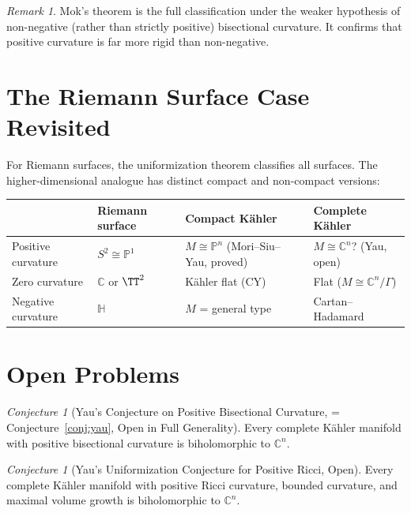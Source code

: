 \documentclass[12pt,a4paper]{amsart}
\theoremstyle{definition}
\theoremstyle{remark}
\newtheorem{remark}[theorem]{Remark}
\newtheorem{conjecture}[theorem]{Conjecture}
\newcommand{\CC}{\mathbb{C}}
\newcommand{\PP}{\mathbb{P}}
\begin{document}
\begin{remark}
Mok's theorem is the full classification under the weaker hypothesis of
non-negative (rather than strictly positive) bisectional curvature.
It confirms that positive curvature is far more rigid than non-negative.
\end{remark}

\section{The Riemann Surface Case Revisited}

For Riemann surfaces, the uniformization theorem classifies all surfaces.
The higher-dimensional analogue has distinct compact and non-compact versions:

\begin{center}
\begin{tabular}{p{3cm}p{3.5cm}p{3.5cm}p{3.5cm}}
\toprule
 & Riemann surface & Compact Kähler & Complete Kähler \\
\midrule
Positive curvature & $S^2 \cong \PP^1$ & $M \cong \PP^n$ (Mori--Siu--Yau, proved) & $M \cong \CC^n$? (Yau, open) \\[4pt]
Zero curvature & $\CC$ or $\TT^2$ & Kähler flat (CY) & Flat ($M \cong \CC^n/\Gamma$) \\[4pt]
Negative curvature & $\mathbb{H}$ & $M$ = general type & Cartan--Hadamard \\
\bottomrule
\end{tabular}
\end{center}

\section{Open Problems}

\begin{conjecture}[Yau's Conjecture on Positive Bisectional Curvature,
= Conjecture~\ref{conj:yau}, Open in Full Generality]
Every complete Kähler manifold with positive bisectional curvature is
biholomorphic to $\CC^n$.
\end{conjecture}

\begin{conjecture}[Yau's Uniformization Conjecture for Positive Ricci, Open]
Every complete Kähler manifold with positive Ricci curvature, bounded
curvature, and maximal volume growth is biholomorphic to $\CC^n$.
\end{conjecture}
\end{document}
